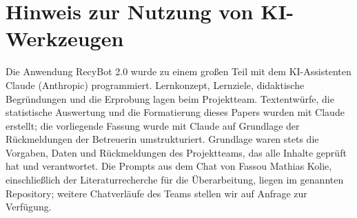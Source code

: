 \documentclass[sigconf,nonacm]{acmart}
\begin{document}
\section*{Hinweis zur Nutzung von KI-Werkzeugen}
Die Anwendung RecyBot 2.0 wurde zu einem großen Teil mit dem KI-Assistenten Claude (Anthropic) programmiert. Lernkonzept, Lernziele, didaktische Begründungen und die Erprobung lagen beim Projektteam. Textentwürfe, die statistische Auswertung und die Formatierung dieses Papers wurden mit Claude erstellt; die vorliegende Fassung wurde mit Claude auf Grundlage der Rückmeldungen der Betreuerin umstrukturiert. Grundlage waren stets die Vorgaben, Daten und Rückmeldungen des Projektteams, das alle Inhalte geprüft hat und verantwortet. Die Prompts aus dem Chat von Fassou Mathias Kolie, einschließlich der Literaturrecherche für die Überarbeitung, liegen im genannten Repository; weitere Chatverläufe des Teams stellen wir auf Anfrage zur Verfügung.
\end{document}
